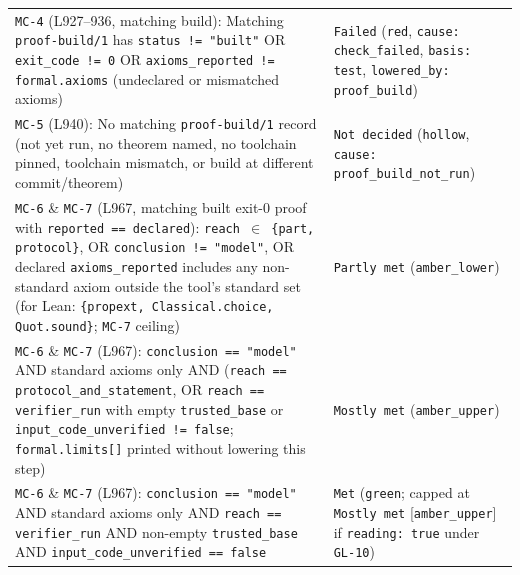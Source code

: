 \documentclass[11pt,letterpaper]{article}
\begin{document}
{\begin{longtable}{@{}>{\raggedright\arraybackslash}p{} >{\raggedright\arraybackslash}p{}@{}}
\texttt{MC-4} (L927--936, matching build): Matching \texttt{proof-\allowbreak{}build/\allowbreak{}1} has \texttt{status != "built"} OR \texttt{exit\_\allowbreak{}code != 0} OR \texttt{axioms\_\allowbreak{}reported != formal.\allowbreak{}axioms} (undeclared or mismatched axioms) & \texttt{Failed} (\texttt{red}, \texttt{cause: check\_\allowbreak{}failed}, \texttt{basis: test}, \texttt{lowered\_\allowbreak{}by: proof\_\allowbreak{}build}) \\
\texttt{MC-5} (L940): No matching \texttt{proof-\allowbreak{}build/\allowbreak{}1} record (not yet run, no theorem named, no toolchain pinned, toolchain mismatch, or build at different commit/theorem) & \texttt{Not decided} (\texttt{hollow}, \texttt{cause: proof\_\allowbreak{}build\_\allowbreak{}not\_\allowbreak{}run}) \\
\texttt{MC-6} \& \texttt{MC-7} (L967, matching built exit-0 proof with \texttt{reported == declared}): \texttt{reach $\in$ \{part, protocol\}}, OR \texttt{conclusion != "model"}, OR declared \texttt{axioms\_\allowbreak{}reported} includes any non-standard axiom outside the tool's standard set (for Lean: \texttt{\{propext, Classical.\allowbreak{}choice, Quot.\allowbreak{}sound\}}; \texttt{MC-7} ceiling) & \texttt{Partly met} (\texttt{amber\_\allowbreak{}lower}) \\
\texttt{MC-6} \& \texttt{MC-7} (L967): \texttt{conclusion == "model"} AND standard axioms only AND (\texttt{reach == protocol\_\allowbreak{}and\_\allowbreak{}statement}, OR \texttt{reach == verifier\_\allowbreak{}run} with empty \texttt{trusted\_\allowbreak{}base} or \texttt{input\_\allowbreak{}code\_\allowbreak{}unverified != false}; \texttt{formal.\allowbreak{}limits[]} printed without lowering this step) & \texttt{Mostly met} (\texttt{amber\_\allowbreak{}upper}) \\
\texttt{MC-6} \& \texttt{MC-7} (L967): \texttt{conclusion == "model"} AND standard axioms only AND \texttt{reach == verifier\_\allowbreak{}run} AND non-empty \texttt{trusted\_\allowbreak{}base} AND \texttt{input\_\allowbreak{}code\_\allowbreak{}unverified == false} & \texttt{Met} (\texttt{green}; capped at \texttt{Mostly met} [\texttt{amber\_\allowbreak{}upper}] if \texttt{reading: true} under \texttt{GL-10}) \\
\end{longtable}
}
\end{document}
